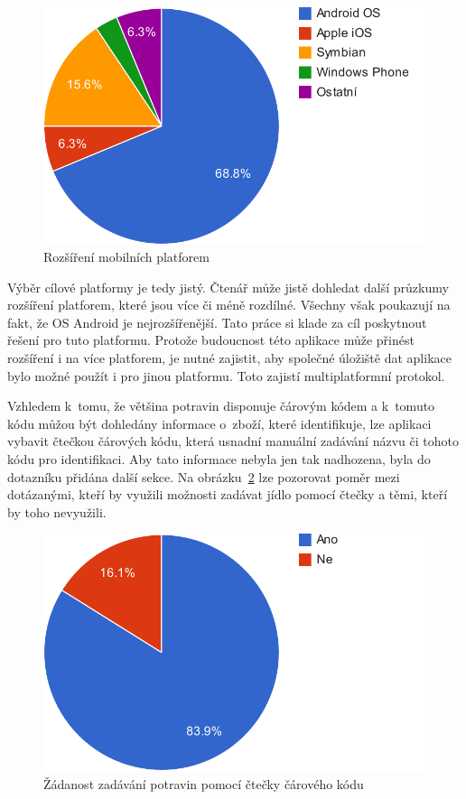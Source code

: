 \documentclass[thesis=B,czech]{FITthesis}[2013/10/20]
\begin{document}
\begin{figure}[H]
  \centering
  \includegraphics[scale=0.8]{charts/survey_os}
  \caption{Rozšíření mobilních platforem}
  \label{fig:SurveyOS}
\end{figure}

Výběr cílové platformy je tedy jistý. Čtenář může jistě dohledat další průzkumy rozšíření platforem, které jsou více či méně rozdílné. Všechny však poukazují na fakt, že OS Android je nejrozšířenější. Tato práce si klade za cíl poskytnout řešení pro tuto platformu. Protože budoucnost této aplikace může přinést rozšíření i na více platforem, je nutné zajistit, aby společné úložiště dat aplikace bylo možné použít i pro jinou platformu. Toto zajistí multiplatformní protokol.

Vzhledem k~tomu, že většina potravin disponuje čárovým kódem a k~tomuto kódu můžou být dohledány informace o~zboží, které identifikuje, lze aplikaci vybavit čtečkou čárových kódu, která usnadní manuální zadávání názvu či tohoto kódu pro identifikaci. Aby tato informace nebyla jen tak nadhozena, byla do dotazníku přidána další sekce. Na obrázku~\ref{fig:SurveyScan} lze pozorovat poměr mezi dotázanými, kteří by využili možnosti zadávat jídlo pomocí čtečky a těmi, kteří by toho nevyužili.

\begin{figure}[H]
  \centering
  \includegraphics[scale=0.8]{charts/survey_scan}
  \caption{Žádanost zadávání potravin pomocí čtečky čárového kódu}
  \label{fig:SurveyScan}
\end{figure}
\end{document}
